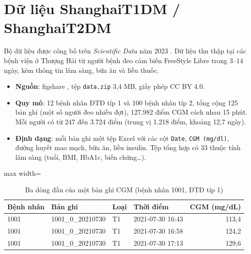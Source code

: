 \section{Dữ liệu ShanghaiT1DM / ShanghaiT2DM}

Bộ dữ liệu được công bố trên \emph{Scientific Data} năm 2023 \cite{zhao2023shanghai}. Dữ liệu thu thập tại các bệnh viện ở Thượng Hải từ người bệnh đeo cảm biến FreeStyle Libre trong 3–14 ngày, kèm thông tin lâm sàng, bữa ăn và liều thuốc.

\begin{itemize}
  \item \textbf{Nguồn}: figshare , tệp \texttt{data.zip} 3,4 MB, giấy phép CC BY 4.0.
  \item \textbf{Quy mô}: 12 bệnh nhân ĐTĐ típ 1 và 100 bệnh nhân típ 2, tổng cộng 125 bản ghi (một số người đeo nhiều đợt), 127.982 điểm CGM cách nhau 15 phút. Mỗi người có từ 247 đến 3.724 điểm (trung vị 1.218 điểm, khoảng 12,7 ngày).
  \item \textbf{Định dạng}: mỗi bản ghi một tệp Excel với các cột \texttt{Date}, \texttt{CGM (mg/dl)}, đường huyết mao mạch, bữa ăn, liều insulin. Tệp tổng hợp có 33 thuộc tính lâm sàng (tuổi, BMI, HbA1c, biến chứng\ldots).
\end{itemize}

\begin{table}[H]
\centering
\caption{Ba dòng đầu của một bản ghi CGM (bệnh nhân 1001, ĐTĐ típ 1)}
\label{tab:cgm-head}
\small
\begin{adjustbox}{max width=\linewidth}
\begin{tabular}{@{}llllr@{}}
\toprule
\textbf{Bệnh nhân} & \textbf{Bản ghi} & \textbf{Loại} & \textbf{Thời điểm} & \textbf{CGM (mg/dL)} \\
\midrule
1001 & 1001\_0\_20210730 & T1 & 2021-07-30 16:43 & 113,4 \\
1001 & 1001\_0\_20210730 & T1 & 2021-07-30 16:58 & 124,2 \\
1001 & 1001\_0\_20210730 & T1 & 2021-07-30 17:13 & 129,6 \\
\bottomrule
\end{tabular}
\end{adjustbox}
\end{table}



